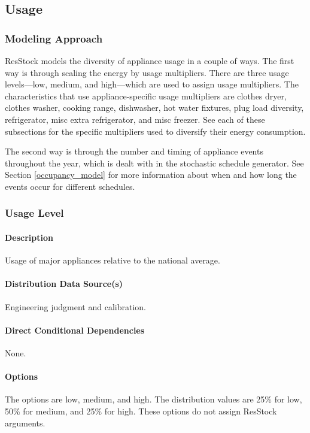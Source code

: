 \subsection{Usage} \label{usage_level}
\subsubsection{Modeling Approach}
ResStock models the diversity of appliance usage in a couple of ways. The first way is through scaling the energy by usage multipliers. There are three usage levels---low, medium, and high---which are used to assign usage multipliers. The characteristics that use appliance-specific usage multipliers are clothes dryer, clothes washer, cooking range, dishwasher, hot water fixtures, plug load diversity, refrigerator, misc extra refrigerator, and misc freezer. See each of these subsections for the specific multipliers used to diversify their energy consumption. 

The second way is through the number and timing of appliance events throughout the year, which is dealt with in the stochastic schedule generator. See Section \ref{occupancy_model} for more information about when and how long the events occur for different schedules. 


\subsubsection{Usage Level} 
\paragraph{Description}
Usage of major appliances relative to the national average.

\paragraph{Distribution Data Source(s)}
Engineering judgment and calibration.

\paragraph{Direct Conditional Dependencies}
None.

\paragraph{Options}
The options are low, medium, and high. The distribution values are 25\% for low, 50\% for medium, and 25\% for high. These options do not assign ResStock arguments.

